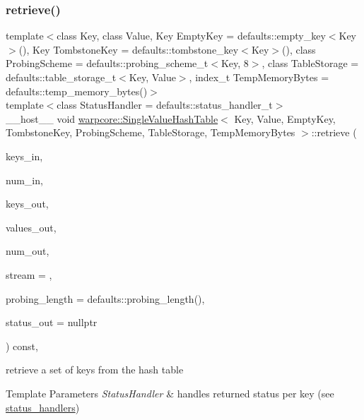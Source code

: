 \subsubsection{\texorpdfstring{retrieve()}{retrieve()}\hspace{0.1cm}{\footnotesize\ttfamily [3/3]}}
{\footnotesize\ttfamily template$<$class Key, class Value, Key Empty\+Key = defaults\+::empty\+\_\+key$<$\+Key$>$(), Key Tombstone\+Key = defaults\+::tombstone\+\_\+key$<$\+Key$>$(), class Probing\+Scheme = defaults\+::probing\+\_\+scheme\+\_\+t$<$\+Key, 8$>$, class Table\+Storage = defaults\+::table\+\_\+storage\+\_\+t$<$\+Key, Value$>$, index\+\_\+t Temp\+Memory\+Bytes = defaults\+::temp\+\_\+memory\+\_\+bytes()$>$ \\
template$<$class Status\+Handler  = defaults\+::status\+\_\+handler\+\_\+t$>$ \\
\+\_\+\+\_\+host\+\_\+\+\_\+ void \hyperlink{classwarpcore_1_1SingleValueHashTable}{warpcore\+::\+Single\+Value\+Hash\+Table}$<$ Key, Value, Empty\+Key, Tombstone\+Key, Probing\+Scheme, Table\+Storage, Temp\+Memory\+Bytes $>$\+::retrieve (\begin{DoxyParamCaption}\item[{const key\+\_\+type $\ast$const}]{keys\+\_\+in,  }\item[{const index\+\_\+type}]{num\+\_\+in,  }\item[{key\+\_\+type $\ast$const}]{keys\+\_\+out,  }\item[{value\+\_\+type $\ast$const}]{values\+\_\+out,  }\item[{index\+\_\+type \&}]{num\+\_\+out,  }\item[{const cuda\+Stream\+\_\+t}]{stream = {},  }\item[{const index\+\_\+type}]{probing\+\_\+length = {\ttfamily defaults\+:\+:probing\+\_\+length()},  }\item[{typename Status\+Handler\+::base\+\_\+type $\ast$const}]{status\+\_\+out = {\ttfamily nullptr} }\end{DoxyParamCaption}) const\hspace{0.3cm}{\ttfamily [inline]}, {\ttfamily [noexcept]}}



retrieve a set of keys from the hash table 


\begin{DoxyTemplParams}{Template Parameters}
{\em Status\+Handler} & handles returned status per key (see {\ttfamily \hyperlink{namespacewarpcore_1_1status__handlers}{status\+\_\+handlers}}) \\
\hline
\end{DoxyTemplParams}

